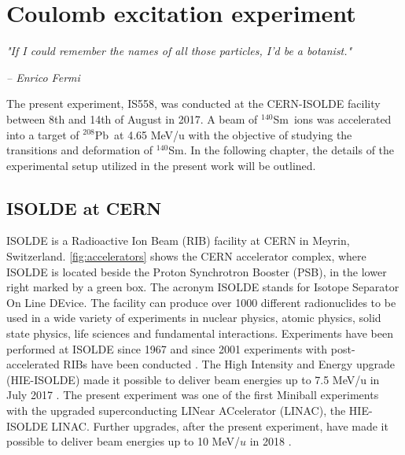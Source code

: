 \documentclass[twoside,english]{uiofysmaster/uiofysmaster}
\newcommand{\Sm}{$^{140}$Sm} %
\newcommand{\Pb}{$^{208}$Pb}
\let\orgautoref\autoref
\renewcommand{\autoref}
        {%
		 \def\sectionautorefname{Section}%
		 \def\subsectionautorefname{Section}%
		 \def\subsubsectionautorefname{Section}%
		 \def\chapterautorefname{Chapter}%
          \orgautoref}
\begin{document}

\chapter{Coulomb excitation experiment}\label{ch:experiment}
\epigraph{\textit{"If I could remember the names of all those particles, I'd be a botanist."}}{\textit{– Enrico Fermi}}


The present experiment, IS558, was conducted at the CERN-ISOLDE facility between 8th and 14th of August in 2017. 
A beam of \Sm\ ions was accelerated into a target of \Pb\ at 4.65 MeV/u with the objective of studying the transitions and deformation of \Sm.
In the following chapter, the details of the experimental setup utilized in the present work will be outlined. 


\section{ISOLDE at CERN}
ISOLDE is a Radioactive Ion Beam (RIB) facility at CERN in Meyrin, Switzerland. \autoref{fig:accelerators} shows the CERN accelerator complex, where ISOLDE is located beside the Proton Synchrotron Booster (PSB), in the lower right marked by a green box. The acronym ISOLDE stands for Isotope Separator On Line DEvice. The facility can produce over 1000 different radionuclides to be used in a wide variety of experiments in nuclear physics, atomic physics, solid state physics, life sciences and fundamental interactions. Experiments have been performed at ISOLDE since 1967 and since 2001 experiments with post-accelerated RIBs have been conducted  \cite{HIE-ISOLDE, ISOLDE-web, ISOLDE-facility}. 
The High Intensity and Energy upgrade (HIE-ISOLDE) made it possible to deliver beam energies up to 7.5 MeV/u in July 2017 \cite{CERN-news}. 
The present experiment was one of the first Miniball experiments with the upgraded superconducting LINear ACcelerator (LINAC), the HIE-ISOLDE LINAC. 
Further upgrades, after the present experiment, have made it possible to deliver beam energies up to 10 MeV/$u$ in 2018 \cite{HIE-ISOLDE}. 
\end{document}
